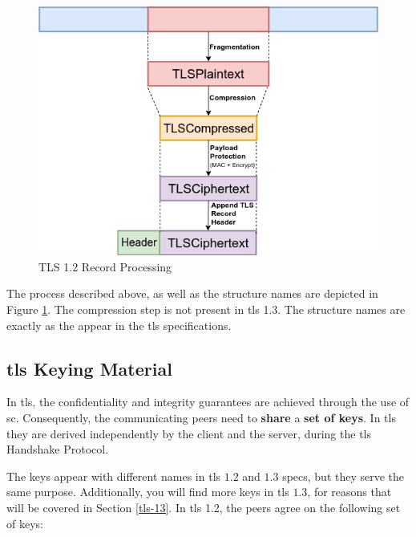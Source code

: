 \documentclass{llncs}
\begin{document}
{\begin{figure}
  \caption{\label{fig:tls-record-processing}TLS 1.2 Record Processing}
  \centering
  \includegraphics[width=1.0\textwidth]{img/tls-record-processing-3.png}
\end{figure}

The process described above, as well as the structure names are depicted in Figure \ref{fig:tls-record-processing}.
The compression step is not present in \gls{tls} 1.3. The structure names are exactly as the appear in the \gls{tls} specifications.

\subsection{\gls{tls} Keying Material} \label{keying}

In \gls{tls}, the confidentiality and integrity guarantees are achieved through the use
of \gls{sc}. Consequently, the communicating peers need to \textbf{share}
a \textbf{set of keys}. In \gls{tls} they are derived independently by the
client and the server, during the \gls{tls} Handshake Protocol.

The keys appear with different names in \gls{tls} $1.2$ and $1.3$ specs, but
they serve the same purpose. Additionally, you will find more keys in
\gls{tls} $1.3$, for reasons that will be covered in Section \ref{tls-13}.
In \gls{tls} 1.2, the peers agree on the following set of keys:

}
\end{document}

